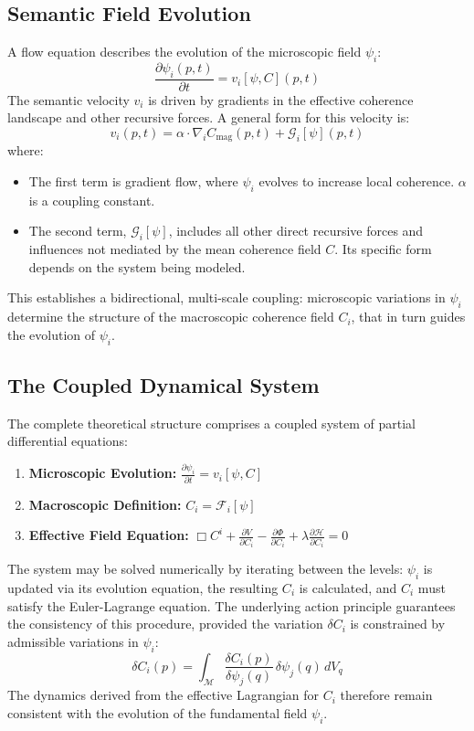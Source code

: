 \subsection{Semantic Field Evolution}

A flow equation describes the evolution of the microscopic field \(\psi_i\):
\begin{equation}
\frac{\partial \psi_i(p, t)}{\partial t} = v_i[\psi, C](p, t)
\end{equation}
The semantic velocity \(v_i\) is driven by gradients in the effective coherence landscape and other recursive forces. A general form for this velocity is:
\begin{equation}
v_i(p, t) = \alpha \cdot \nabla_i C_{\mathrm{mag}}(p, t) + \mathcal{G}_i[\psi](p, t)
\end{equation}
where:
\begin{itemize}
    \item The first term is gradient flow, where \(\psi_i\) evolves to increase local coherence. \(\alpha\) is a coupling constant.
    \item The second term, \(\mathcal{G}_i[\psi]\), includes all other direct recursive forces and influences not mediated by the mean coherence field \(C\). Its specific form depends on the system being modeled.
\end{itemize}
This establishes a bidirectional, multi-scale coupling: microscopic variations in \(\psi_i\) determine the structure of the macroscopic coherence field \(C_i\), that in turn guides the evolution of \(\psi_i\).

\subsection{The Coupled Dynamical System}

The complete theoretical structure comprises a coupled system of partial differential equations:
\begin{enumerate}
    \item \textbf{Microscopic Evolution:} \(\displaystyle \frac{\partial \psi_i}{\partial t} = v_i[\psi, C]\)
    \item \textbf{Macroscopic Definition:} \(C_i = \mathcal{F}_i[\psi]\)
    \item \textbf{Effective Field Equation:} \(\Box C^i + \frac{\partial V}{\partial C_i} - \frac{\partial \Phi}{\partial C_i} + \lambda \frac{\partial \mathcal{H}}{\partial C_i} = 0\)
\end{enumerate}
The system may be solved numerically by iterating between the levels: \(\psi_i\) is updated via its evolution equation, the resulting \(C_i\) is calculated, and \(C_i\) must satisfy the Euler-Lagrange equation. The underlying action principle guarantees the consistency of this procedure, provided the variation \(\delta C_i\) is constrained by admissible variations in \(\psi_i\):
\begin{equation}
\delta C_i(p) = \int_{\mathcal{M}} \frac{\delta C_i(p)}{\delta \psi_j(q)} \, \delta \psi_j(q) \, dV_q
\end{equation}
The dynamics derived from the effective Lagrangian for \(C_i\) therefore remain consistent with the evolution of the fundamental field \(\psi_i\).